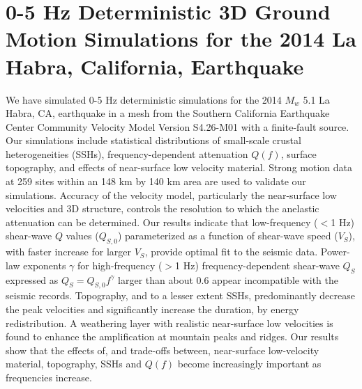 \newcommand{\red}[1]{\textcolor{red}{#1}}
\newcommand{\blue}[1]{\textcolor{blue}{#1}}
\newcommand{\green}[1]{\textcolor{green}{#1}}
\newcommand{\purple}[1]{\textcolor{purple}{#1}}

\linespread{1.7}
\chapter{0-5 Hz Deterministic 3D Ground Motion Simulations for the 2014 La Habra, California, Earthquake}
\linespread{2.0}
\label{chap:highf}

\graphicspath{{/Users/zhh076/work/PhD_way/high_f/}}

We have simulated 0-5 Hz deterministic simulations for the 2014 $M_w$ 5.1 La Habra, CA, earthquake in a mesh from the Southern California Earthquake Center Community Velocity Model Version S4.26-M01 with a finite-fault source. Our simulations include statistical distributions of small-scale crustal heterogeneities (SSHs), frequency-dependent attenuation $Q(f)$, surface topography, and effects of near-surface low velocity material. Strong motion data at 259 sites within an 148 km by 140 km area are used to validate our simulations. %
Accuracy of the velocity model, particularly the  near-surface low velocities and 3D structure, controls the resolution to which the anelastic attenuation can be determined. Our results indicate that low-frequency ($<$1 Hz) shear-wave $Q$ values ($Q_{S,0}$) parameterized as a function of shear-wave speed ($V_S$), with faster increase for larger $V_S$, provide optimal fit to the seismic data. Power-law exponents {$\gamma$} for high-frequency ($>$1 Hz) frequency-dependent shear-wave $Q_S$ expressed as $Q_S=Q_{S,0} f^{\gamma}$ larger than about 0.6 appear incompatible with the seismic records. 
Topography, and to a lesser extent SSHs, predominantly decrease the peak velocities and significantly increase the duration, by energy redistribution. A weathering layer with realistic near-surface low velocities is found to enhance the amplification at mountain peaks and ridges. Our results show that the effects of, and trade-offs between, near-surface low-velocity material, topography, SSHs and $Q(f)$ become increasingly important as frequencies increase.


